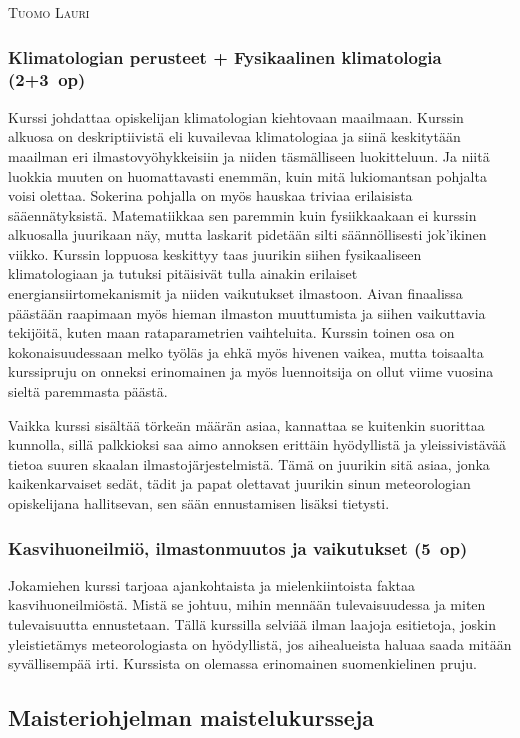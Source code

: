 \documentclass[../ala_hataile.tex]{subfiles}
\begin{document}
\vspace{0.5cm}\noindent\textsc{Tuomo Lauri}

\subsubsection*{Klimatologian perusteet + Fysikaalinen klimatologia (2+3~op)}
Kurssi johdattaa opiskelijan
klimatologian kiehtovaan maailmaan.
Kurssin alkuosa on
deskriptiivistä eli kuvailevaa
klimatologiaa ja siinä
keskitytään maailman eri ilmasto\-vyöhykkeisiin ja niiden täsmälliseen
luokitteluun. Ja niitä luokkia muuten
on huomattavasti enemmän, kuin mitä lukiomantsan
pohjalta voisi olettaa. Sokerina
pohjalla on myös hauskaa triviaa erilaisista
sääennätyksistä. Matematiikkaa sen paremmin
kuin fysiikkaakaan ei kurssin alkuosalla
juurikaan näy, mutta laskarit pidetään
silti säännöllisesti jok'ikinen viikko.
Kurssin loppuosa keskittyy taas juurikin
siihen fysikaaliseen klimatologiaan ja tutuksi
pitäisivät tulla ainakin erilaiset energian\-siirto\-mekanismit
ja niiden vaikutukset
ilmastoon. Aivan finaalissa päästään raapimaan
myös hieman ilmaston muuttumista
ja siihen vaikuttavia tekijöitä, kuten maan
rataparametrien vaihteluita. Kurssin toinen
osa on kokonaisuudessaan melko työläs ja
ehkä myös hivenen vaikea, mutta toisaalta
kurssipruju on onneksi erinomainen ja
myös luennoitsija on ollut viime vuosina
sieltä paremmasta päästä.

Vaikka kurssi sisältää törkeän määrän
asiaa, kannattaa se kuitenkin suorittaa kunnolla,
sillä palkkioksi saa aimo annoksen
erittäin hyödyllistä ja yleissivistävää tietoa
suuren skaalan ilmastojärjestelmistä. Tämä
on juurikin sitä asiaa, jonka kaikenkarvaiset
sedät, tädit ja papat olettavat juurikin
sinun meteorologian opiskelijana hallitsevan,
sen sään ennustamisen lisäksi tietysti.

\subsubsection*{Kasvihuoneilmiö, ilmastonmuutos ja vaikutukset (5~op)}
Jokamiehen kurssi tarjoaa ajankohtaista
ja mielenkiintoista faktaa kasvihuoneilmiöstä.
Mistä se johtuu, mihin mennään
tulevaisuudessa ja miten tulevaisuutta
ennustetaan. Tällä kurssilla selviää ilman
laajoja esitietoja, joskin yleistietämys meteorologiasta
on hyödyllistä, jos aihealueista
haluaa saada mitään syvällisempää irti.
Kurssista on olemassa erinomainen suomenkielinen
pruju.

\subsection*{Maisteriohjelman maistelukursseja}
\end{document}
